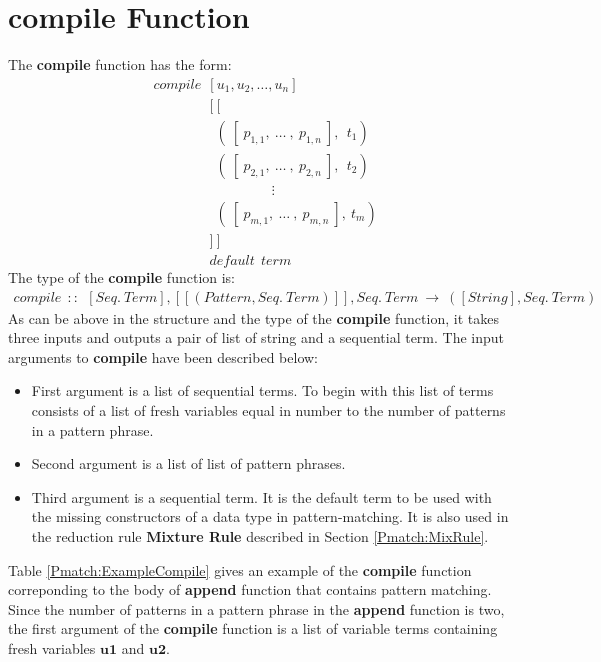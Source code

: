 \documentclass[11pt]{article}
\begin{document}
\section {compile Function}
The {\bf compile} function has the form:
\begin{align*} 
&compile~~[u_1,u_2,\ldots,u_n] \\
&\qquad\qquad [~[\\
&\qquad\qquad ~~(~[~p_{1,1},~\ldots~, ~ p_{1,n}~],~~t_1) \\
&\qquad\qquad ~~(~[~p_{2,1},~\ldots~, ~ p_{2,n}~],~~t_2) \\
&\qquad\qquad ~~ \qquad\qquad \vdots\qquad\qquad  \\ 
&\qquad\qquad ~~(~[~p_{m,1},~\ldots~, ~ p_{m,n}~],~t_m) \\
&\qquad\qquad ]~]\\
&\qquad\qquad default~~term
\end{align*} 
The type of the {\bf compile} function is:
\begin{align*}
compile~~::~~[Seq.~Term],[[(Pattern,Seq.~Term)]],Seq.~Term~ \to~ ([String],Seq.~Term)
\end{align*}
As can be above in the structure and the type of the {\bf compile} function, it takes three inputs and outputs a pair of list of string and a sequential term. The input arguments to {\bf compile} have been described below:
\begin{itemize}
  \item First argument is a list of sequential terms. To begin with this list of terms consists of a list of fresh variables equal in number to the number of patterns in a pattern phrase.
  \item Second argument is a list of list of pattern phrases.
  \item Third argument is a sequential term. It is the default term to be used with the missing constructors of a data type in pattern-matching. It is also used in the reduction rule {\bf Mixture Rule} described in Section \ref{Pmatch:MixRule}.
\end{itemize}
Table \ref {Pmatch:ExampleCompile} gives an example of the 
{\bf compile} function correponding to the body of {\bf append} function that contains pattern matching. Since the number of patterns in a pattern phrase in the {\bf append} function is two, the first argument of the {\bf compile} function is a list of variable terms containing fresh variables $\mathbf{u1}$ and $\mathbf{u2}$. 
~~\\~~\\ 
\end{document}
